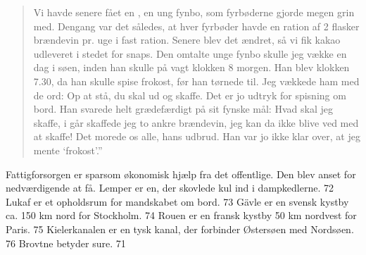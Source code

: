 \begin{quote}
    Vi havde senere fået en , en ung fynbo, som fyrbøderne gjorde
    megen grin med. Dengang var det således, at hver fyrbøder havde en
    ration af 2 flasker brændevin pr. uge i fast ration. Senere blev det
    ændret, så vi fik kakao udleveret i stedet for snaps. Den omtalte
    unge fynbo skulle jeg vække en dag i søen, inden han skulle på vagt
    klokken 8 morgen. Han blev  klokken 7.30, da han skulle
    spise frokost, før han tørnede til. Jeg vækkede ham med de ord: Op at
    stå, du skal ud og skaffe. Det er jo udtryk for spisning om bord. Han
    svarede helt grædefærdigt på sit fynske mål: Hvad skal jeg skaffe, i
    går skaffede jeg to ankre brændevin, jeg kan da ikke blive ved med at
    skaffe! Det morede os alle, hans udbrud.  Han var jo ikke klar over,
    at jeg mente `frokost'.''
\end{quote}
    
    Fattigforsorgen er sparsom økonomisk hjælp fra det offentlige. Den blev
    anset for nedværdigende at få. Lemper er en, der skovlede kul ind i
    dampkedlerne. 72 Lukaf er et opholdsrum for mandskabet om bord. 73 Gävle
    er en svensk kystby ca. 150 km nord for Stockholm. 74 Rouen er en fransk
    kystby 50 km nordvest for Paris. 75 Kielerkanalen er en tysk kanal, der
    forbinder Østersøen med Nordsøen. 76 Brovtne betyder sure. 71
    
